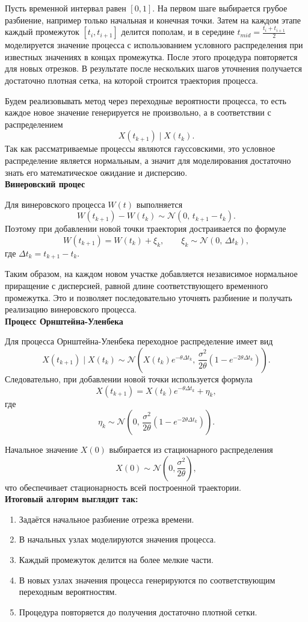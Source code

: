 \documentclass[11pt]{article}
\begin{document}
Пусть временной интервал равен $[0,1]$. На первом шаге выбирается грубое разбиение, например только начальная и конечная точки. Затем на каждом этапе каждый промежуток $[t_i,t_{i+1}]$ делится пополам, и в середине $t_{mid}=\frac{t_i+t_{i+1}}{2}$ моделируется значение процесса с использованием условного распределения при известных значениях в концах промежутка. После этого процедура повторяется для новых отрезков. В результате после нескольких шагов уточнения получается достаточно плотная сетка, на которой строится траектория процесса.

Будем реализовывать метод через переходные вероятности процесса, то есть каждое новое значение генерируется не произвольно, а в соответствии с распределением
$$
X(t_{k+1}) \mid X(t_k).
$$
Так как рассматриваемые процессы являются гауссовскими, это условное распределение является нормальным, а значит для моделирования достаточно знать его математическое ожидание и дисперсию.
\\
\textbf{Винеровский процес}

Для винеровского процесса \(W(t)\) выполняется
$$
W(t_{k+1}) - W(t_k) \sim \mathcal{N}(0,\, t_{k+1}-t_k).
$$
Поэтому при добавлении новой точки траектория достраивается по формуле
$$
W(t_{k+1}) = W(t_k) + \xi_k, \qquad \xi_k \sim \mathcal{N}(0,\, \Delta t_k),
$$
где $\Delta t_k = t_{k+1}-t_k$.

Таким образом, на каждом новом участке добавляется независимое нормальное приращение с дисперсией, равной длине соответствующего временного промежутка. Это и позволяет последовательно уточнять разбиение и получать реализацию винеровского процесса.
\\
\textbf{Процесс Орнштейна-Уленбека}

Для процесса Орнштейна-Уленбека переходное распределение имеет вид
$$
X(t_{k+1}) \mid X(t_k) \sim \mathcal{N}\left(X(t_k)e^{-\theta \Delta t_k},\,
\frac{\sigma^2}{2\theta}\left(1-e^{-2\theta \Delta t_k}\right)\right).
$$
Следовательно, при добавлении новой точки используется формула
$$
X(t_{k+1}) = X(t_k)e^{-\theta \Delta t_k} + \eta_k,
$$
где
$$
\eta_k \sim \mathcal{N}\left(0,\,
\frac{\sigma^2}{2\theta}\left(1-e^{-2\theta \Delta t_k}\right)\right).
$$

Начальное значение $X(0)$ выбирается из стационарного распределения
$$
X(0)\sim \mathcal{N}\left(0,\frac{\sigma^2}{2\theta}\right),
$$
что обеспечивает стационарность всей построенной траектории.
\\
\textbf{Итоговый алгорим выглядит так:}
\begin{enumerate}
    \item Задаётся начальное разбиение отрезка времени.
    \item В начальных узлах моделируются значения процесса.
    \item Каждый промежуток делится на более мелкие части.
    \item В новых узлах значения процесса генерируются по соответствующим переходным вероятностям.
    \item Процедура повторяется до получения достаточно плотной сетки.
\end{enumerate}
\end{document}
